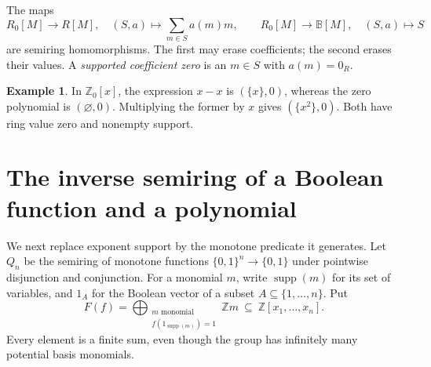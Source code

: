 \documentclass[11pt]{article}
\newcommand{\B}{\mathbb B}
\newcommand{\Z}{\mathbb Z}
\newcommand{\supp}{\operatorname{supp}}
\theoremstyle{definition}
\newtheorem{example}[theorem]{Example}
\theoremstyle{remark}
\begin{document}
The maps
\[
 R_0[M]\longrightarrow R[M],\quad (S,a)\longmapsto\sum_{m\in S}a(m)m,
 \qquad
 R_0[M]\longrightarrow\B[M],\quad (S,a)\longmapsto S
\]
are semiring homomorphisms. The first may erase coefficients; the second erases their values. A \emph{supported coefficient zero} is an $m\in S$ with $a(m)=0_R$.

\begin{example}
In $\Z_0[x]$, the expression $x-x$ is $(\{x\},0)$, whereas the zero polynomial is $(\varnothing,0)$. Multiplying the former by $x$ gives $(\{x^2\},0)$. Both have ring value zero and nonempty support.
\end{example}

\section{The inverse semiring of a Boolean function and a polynomial}
We next replace exponent support by the monotone predicate it generates.
Let $Q_n$ be the semiring of monotone functions $\{0,1\}^n\to\{0,1\}$ under pointwise disjunction and conjunction. For a monomial $m$, write $\supp(m)$ for its set of variables, and $1_A$ for the Boolean vector of a subset $A\subseteq\{1,\ldots,n\}$. Put
\[
 F(f)=\bigoplus_{\substack{m\text{ monomial}\\f(1_{\supp(m)})=1}}\Z m
 \ \subseteq\ \Z[x_1,\ldots,x_n].
\]
Every element is a finite sum, even though the group has infinitely many potential basis monomials.
\end{document}
